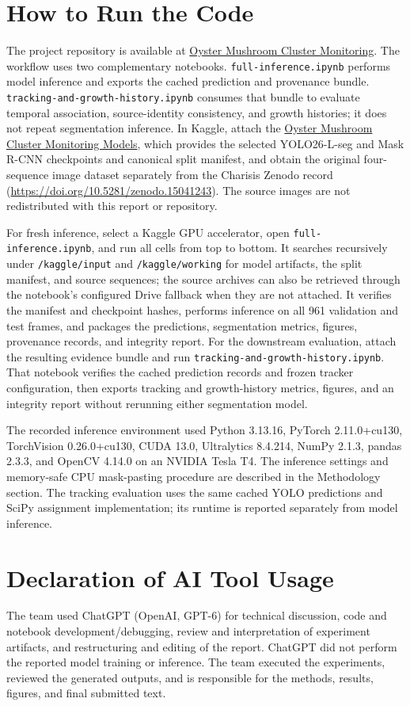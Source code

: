\documentclass[11pt,a4paper]{article}
\begin{document}
\appendix
\section{How to Run the Code}

The project repository is available at \href{https://github.com/h-nam-sys/Oyster-Mushroom-Cluster-Monitoring}{Oyster Mushroom Cluster Monitoring}. The workflow uses two complementary notebooks. \texttt{full-inference.ipynb} performs model inference and exports the cached prediction and provenance bundle. \texttt{tracking-and-growth-history.ipynb} consumes that bundle to evaluate temporal association, source-identity consistency, and growth histories; it does not repeat segmentation inference. In Kaggle, attach the \href{https://www.kaggle.com/datasets/hnamedu/fungicirno-models}{Oyster Mushroom Cluster Monitoring Models}, which provides the selected YOLO26-L-seg and Mask R-CNN checkpoints and canonical split manifest, and obtain the original four-sequence image dataset separately from the Charisis Zenodo record (\url{https://doi.org/10.5281/zenodo.15041243}). The source images are not redistributed with this report or repository.

For fresh inference, select a Kaggle GPU accelerator, open \texttt{full-inference.ipynb}, and run all cells from top to bottom. It searches recursively under \texttt{/kaggle/input} and \texttt{/kaggle/working} for model artifacts, the split manifest, and source sequences; the source archives can also be retrieved through the notebook's configured Drive fallback when they are not attached. It verifies the manifest and checkpoint hashes, performs inference on all 961 validation and test frames, and packages the predictions, segmentation metrics, figures, provenance records, and integrity report. For the downstream evaluation, attach the resulting evidence bundle and run \texttt{tracking-and-growth-history.ipynb}. That notebook verifies the cached prediction records and frozen tracker configuration, then exports tracking and growth-history metrics, figures, and an integrity report without rerunning either segmentation model.

The recorded inference environment used Python 3.13.16, PyTorch 2.11.0+cu130, TorchVision 0.26.0+cu130, CUDA 13.0, Ultralytics 8.4.214, NumPy 2.1.3, pandas 2.3.3, and OpenCV 4.14.0 on an NVIDIA Tesla T4. The inference settings and memory-safe CPU mask-pasting procedure are described in the Methodology section. The tracking evaluation uses the same cached YOLO predictions and SciPy assignment implementation; its runtime is reported separately from model inference.

\section{Declaration of AI Tool Usage}

The team used ChatGPT (OpenAI, GPT-6) for technical discussion, code and notebook development/debugging, review and interpretation of experiment artifacts, and restructuring and editing of the report. ChatGPT did not perform the reported model training or inference. The team executed the experiments, reviewed the generated outputs, and is responsible for the methods, results, figures, and final submitted text.
\end{document}
